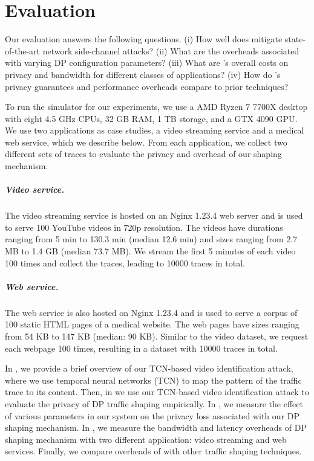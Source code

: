 \chapter{Evaluation}\label{ch:evaluation}
Our evaluation answers the following questions.
(i) How well does {\sys} mitigate state-of-the-art network side-channel attacks?
(ii) What are the overheads associated with varying DP configuration parameters?
(iii) What are {\sys}'s overall costs on privacy and bandwidth for different classes of applications?
(iv) How do {\sys}'s privacy guarantees and performance overheads compare to prior techniques?


To run the simulator for our experiments, we use a AMD Ryzen 7 7700X desktop with eight 4.5 GHz CPUs, 32 GB RAM, 1 TB storage, and a GTX 4090 GPU.
We use two applications as case studies, a video streaming service and a medical web service, which we describe below.
From each application, we collect two different sets of traces to evaluate the privacy and overhead of our shaping mechanism.
\paragraph{Video service.}
The video streaming service is hosted on an Nginx 1.23.4 web server and is used to serve 100 YouTube videos in 720p resolution.
The videos have durations ranging from 5 min to 130.3 min (median 12.6 min) and sizes ranging from 2.7 MB to 1.4 GB (median 73.7 MB).
We stream the first 5 minutes of each video 100 times and collect the traces, leading to 10000 traces in total.

\paragraph{Web service.}
The web service is also hosted on Nginx 1.23.4 and is used to serve a corpus of 100 static HTML pages of a medical website.
The web pages have sizes ranging from 54 KB to 147 KB (median: 90 KB).
Similar to the video dataset, we request each webpage 100 times, resulting in a dataset with 10000 traces in total.
%


In , we provide a brief overview of our TCN-based video identification attack, where we use temporal neural networks (TCN) to map the pattern of the traffic trace to its content.
Then, in  we use our TCN-based video identification attack to evaluate the privacy of DP traffic shaping empirically.
In , we measure the effect of various parameters in our system on the privacy loss associated with our DP shaping mechanism. 
In , we measure the bandwidth and latency overheads of DP shaping mechanism with two different application: video streaming and web services.
Finally, we compare overheads of {\sys} with other traffic shaping techniques.  


